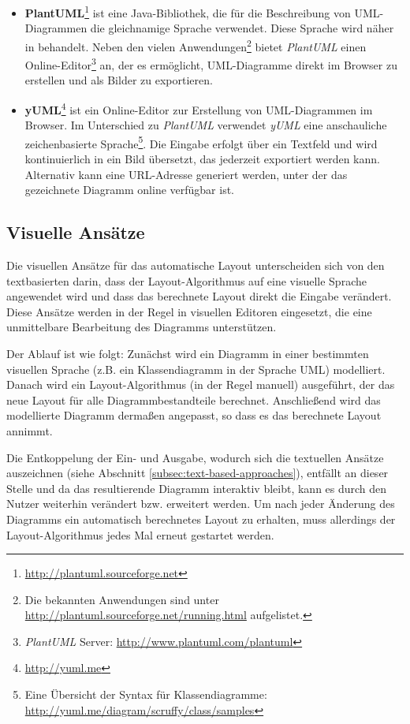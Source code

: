 \begin{itemize}
    \item \textbf{PlantUML}\footnote{\url{http://plantuml.sourceforge.net}} ist eine Java-Bibliothek, die für die Beschreibung von UML-\-Dia\-grammen die gleichnamige Sprache verwendet. Diese Sprache wird näher in \cite{Roques10Drawing} behandelt. Neben den vielen Anwendungen\footnote{Die bekannten Anwendungen sind unter \url{http://plantuml.sourceforge.net/running.html} aufgelistet.} bietet \textit{PlantUML} einen Online-Editor\footnote{\textit{PlantUML} Server: \url{http://www.plantuml.com/plantuml}} an, der es ermöglicht, UML-Diagramme direkt im Browser zu erstellen und als Bilder zu exportieren.
    \item \textbf{yUML}\footnote{\url{http://yuml.me}} ist ein Online-Editor zur Erstellung von UML-Diagrammen im Browser. Im Unterschied zu \textit{PlantUML} verwendet \textit{yUML} eine anschauliche zeichenbasierte Sprache\footnote{Eine Übersicht der Syntax für Klassendiagramme: \url{http://yuml.me/diagram/scruffy/class/samples}}. Die Eingabe erfolgt über ein Textfeld und wird kontinuierlich in ein Bild übersetzt, das jederzeit exportiert werden kann. Alternativ kann eine URL-Adresse generiert \cite{Fuhrmann11On-the-Pragmatics} werden, unter der das gezeichnete Diagramm online verfügbar ist.
\end{itemize}

\subsection{Visuelle Ansätze}
\label{subsec:visual-approaches}

Die visuellen Ansätze für das automatische Layout unterscheiden sich von den textbasierten darin, dass der Layout-Algorithmus auf eine visuelle Sprache angewendet wird und dass das berechnete Layout direkt die Eingabe verändert. Diese Ansätze werden in der Regel in visuellen Editoren eingesetzt, die eine unmittelbare Bearbeitung des Diagramms unterstützen.

Der Ablauf ist wie folgt: Zunächst wird ein Diagramm in einer bestimmten visuellen Sprache (z.B. ein Klassendiagramm in der Sprache UML) modelliert. Danach wird ein Layout-Algorithmus (in der Regel manuell) ausgeführt, der das neue Layout für alle Diagrammbestandteile berechnet. Anschließend wird das modellierte Diagramm dermaßen angepasst, so dass es das berechnete Layout annimmt.

Die Entkoppelung der Ein- und Ausgabe, wodurch sich die textuellen Ansätze auszeichnen (siehe Abschnitt \ref{subsec:text-based-approaches}), entfällt an dieser Stelle und da das resultierende Diagramm interaktiv bleibt, kann es durch den Nutzer weiterhin verändert bzw. erweitert werden. Um nach jeder Änderung des Diagramms ein automatisch berechnetes Layout zu erhalten, muss allerdings der Layout-Algorithmus jedes Mal erneut gestartet werden.

